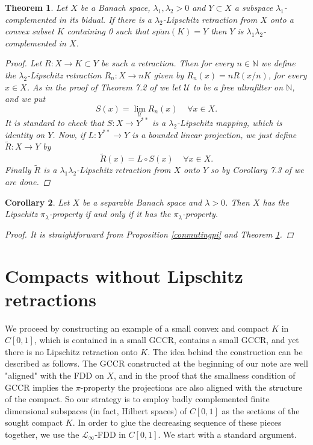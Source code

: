 \documentclass[11pt]{amsart}
\newcommand{\N}{\mathbb{N}}
\newcommand{\<}{\langle}
\renewcommand{\>}{\rangle}
\newtheorem{theorem}{Theorem}[section]
\newtheorem{corollary}[theorem]{Corollary}
\theoremstyle{definition}
\theoremstyle{remark}
\numberwithin{equation}{section}
\begin{document}
\begin{theorem}\label{complemented}
Let $X$ be a Banach space, $\lambda_1,\lambda_2>0$ and $Y\subset X$ a subspace $\lambda_1$-complemented in its bidual. If there is a $\lambda_2$-Lipschitz retraction from $X$ onto a convex subset $K$ containing 0 such that $\overline{span}(K)=Y$ then $Y$ is $\lambda_1\lambda_2$-complemented in $X$.
\begin{proof}
Let $R:X\rightarrow K\subset Y$ be such a retraction.  Then for every $n\in\N$ we define the $\lambda_2$-Lipschitz retraction $R_n:X\rightarrow nK$ given by $R_n(x)=nR(x/n)$, for every $x\in X$. 
As in the proof of Theorem 7.2 of \cite{BL2000} we let $\mathcal{U}$ to be a free ultrafilter on $\N$, and we put
$$S(x)=\lim\limits_{\mathcal{U}}R_{n}(x)\;\;\;\;\forall x\in X.$$
It is standard to check that $S: X\to Y^{**}$ is a $\lambda_2$-Lipschitz mapping, which is identity on $Y$.
 Now, if $L:Y^{**}\rightarrow Y$ is a bounded linear projection, we just define $\widetilde{R}:X\rightarrow Y$ by
$$\widetilde{R}(x)=L\circ S(x)\;\;\;\;\forall x\in X.$$
Finally $\widetilde{R}$ is a $\lambda_1\lambda_2$-Lipschitz retraction from $X$ onto $Y$ so by Corollary 7.3 of \cite{BL2000} we are done.
\end{proof}
\end{theorem}

\begin{corollary}
Let $X$ be a separable Banach space and $\lambda>0$. Then $X$ has the Lipschitz $\pi_\lambda$-property if and only if  it has the $\pi_\lambda$-property.
\begin{proof}
It is straightforward from Proposition \ref{conmutingpi} and Theorem \ref{complemented}.
\end{proof}
\end{corollary}


\section{Compacts without Lipschitz retractions}


We proceed by constructing an example of a small convex and compact $K$  in $C[0,1]$, which is contained in a small GCCR, contains a small GCCR, and yet
there is no Lipschitz retraction onto $K$.
The idea behind the construction can be described as follows.  The GCCR constructed at the beginning of our note are well "aligned" with
the FDD on $X$, and in the proof that the smallness condition of GCCR implies the $\pi$-property the projections are also aligned
with the structure of the compact. So our strategy is to employ badly complemented finite dimensional subspaces (in fact, Hilbert spaces) of
$C[0,1]$ as the sections of the sought compact $K$. In order to glue the decreasing sequence of these pieces together, we
use the $\mathcal{L}_\infty$-FDD in $C[0,1]$. We start with a standard argument.
\end{document}
